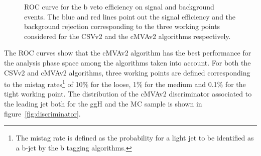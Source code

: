 \begin{figure}[!h]
\centering
{}
\caption{ROC curve for the b veto efficiency on signal and background events. The blue and red lines point out the signal efficiency and the background rejection corresponding to the three working points considered for the CSVv2 and the cMVAv2 algorithms
respectively.}\label{fig:btag}
\end{figure}

The ROC curves show that the cMVAv2 algorithm has the best performance for the analysis phase space among the algorithms taken into account. For both the CSVv2 and cMVAv2 algorithms, three working points are defined corresponding to the mistag rates\footnote{The mistag rate is defined as the probability for a light jet to be identified as a b-jet by the b tagging algorithms.} of 10\% for the loose, 1\% for the medium and 0.1\% for the tight working point. The distribution of the cMVAv2 discriminator associated to the leading jet both for the ggH and the \ttbar MC sample is shown in figure~\ref{fig:discriminator}.

